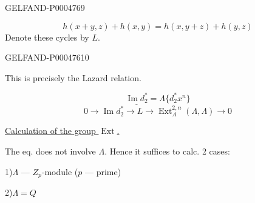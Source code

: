 \begin{GelfandAdjacentEvidence}{GELFAND-P000476}{9}


\[
\boxed{h(x+y,z)+h(x,y)=h(x,y+z)+h(y,z)}
\]
Denote these cycles by $L$.
\end{GelfandAdjacentEvidence}
\begin{GelfandAdjacentEvidence}{GELFAND-P000476}{10}


This is precisely the Lazard relation.
\end{GelfandAdjacentEvidence}


\[
\underline{\operatorname{Im}d_2^*}=\Lambda\{d_2^*x^n\}
\]
\[
0\longrightarrow\operatorname{Im}d_2^*\longrightarrow L
\longrightarrow\operatorname{Ext}_A^{2,n}(\Lambda,\Lambda)\longrightarrow0
\]

\uline{Calculation of the group \mbox{$\operatorname{Ext}$}.}

The eq. does not involve $\Lambda$. Hence it suffices to calc. 2 cases:

1)\quad $\Lambda$ — $Z_p$-module ($p$ — prime)

2)\quad $\Lambda=Q$


